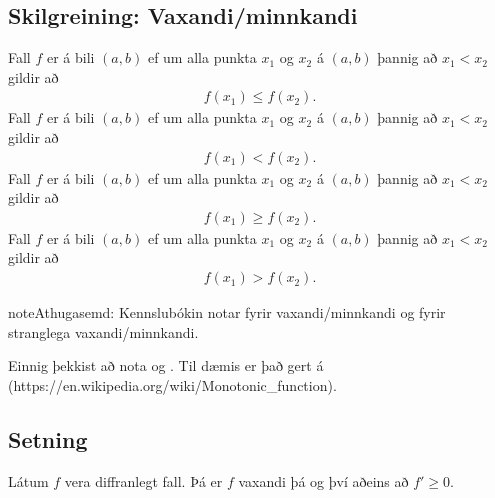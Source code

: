 \documentclass[b5paper,10pt,icelandic]{sphinxmanual}
\begin{document}
\subsection{Skilgreining: Vaxandi/minnkandi}
\label{\detokenize{kafli03:skilgreining-vaxandi-minnkandi}}\label{\detokenize{kafli03:index-9}}
Fall \(f\) er  á bili \((a,b)\) ef um
alla punkta \(x_1\) og \(x_2\) á \((a,b)\) þannig að
\(x_1 < x_2\) gildir að
\begin{equation*}
\begin{split}f(x_1) \leq f(x_2).\end{split}
\end{equation*}
Fall \(f\) er  á bili \((a,b)\)
ef um alla punkta \(x_1\) og \(x_2\) á \((a,b)\) þannig að
\(x_1 < x_2\) gildir að
\begin{equation*}
\begin{split}f(x_1) < f(x_2).\end{split}
\end{equation*}
Fall \(f\) er  á bili \((a,b)\) ef um
alla punkta \(x_1\) og \(x_2\) á \((a,b)\) þannig að
\(x_1 < x_2\) gildir að
\begin{equation*}
\begin{split}f(x_1) \geq f(x_2).\end{split}
\end{equation*}
Fall \(f\) er  á bili
\((a,b)\) ef um alla punkta \(x_1\) og \(x_2\) á
\((a,b)\) þannig að \(x_1 < x_2\) gildir að
\begin{equation*}
\begin{split}f(x_1) > f(x_2).\end{split}
\end{equation*}
\begin{sphinxadmonition}{note}{Athugasemd:}
Kennslubókin notar  fyrir vaxandi/minnkandi og
 fyrir stranglega vaxandi/minnkandi.

Einnig þekkist að nota  og .
Til dæmis er það gert á  (https://en.wikipedia.org/wiki/Monotonic\_function).
\end{sphinxadmonition}


\subsection{Setning}
\label{\detokenize{kafli03:id15}}\label{\detokenize{kafli03:vaxandieoae}}
Látum \(f\) vera diffranlegt fall. Þá er \(f\) vaxandi þá og því
aðeins að \(f' \geq 0\).
\end{document}

